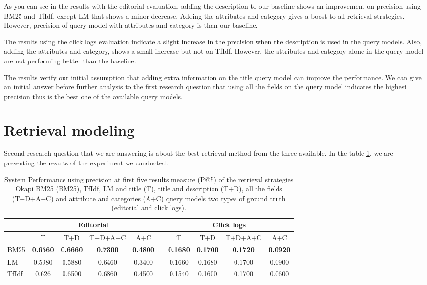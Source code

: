 As you can see in the results with the editorial evaluation, adding the description to our baseline shows an improvement on precision using BM25 and TfIdf, except LM that shows a minor decrease. Adding the attributes and category gives a boost to all retrieval strategies. However, precision of query model with attributes and category is than our baseline.

The results using the click logs evaluation indicate a slight increase in the precision when the description is used in the query models. Also, adding the attributes and category, shows a small increase but not on TfIdf. However, the attributes and category alone in the query model are not performing better than the baseline.

The results verify our initial assumption that adding extra information on the title query model can improve the performance. We can give an initial answer before further analysis to the first research question that using all the fields on the query model indicates the highest precision thus is the best one of the available query models.


\section{Retrieval modeling}

Second research question that we are answering is about the best retrieval method from the three available. In the table \ref{table:qmRes}, we are presenting the results of the experiment we conducted.

\begin{table}[H]
\begin{center}
\scriptsize
\caption{
System Performance using precision at first five results measure (P@5) of the retrieval strategies Okapi BM25 (BM25), TfIdf, LM and title (T), title and description (T+D), all the fields (T+D+A+C) and attribute and categories (A+C) query models two types of ground truth (editorial and click logs).}
\label{table:qmRes}

\begin{tabular}{lccccccccc}
\toprule
 & \multicolumn{4}{c}{Editorial} & &\multicolumn{4}{c}{Click logs} \\
\midrule
& T & T+D & T+D+A+C & A+C &   & T & T+D & T+D+A+C & A+C \\
\midrule
BM25 & \textbf{0.6560} & \textbf{0.6660} & \textbf{0.7300} & \textbf{0.4800} &   &\textbf{0.1680} & \textbf{0.1700} & \textbf{0.1720} & \textbf{0.0920} \\
LM & 0.5980 & 0.5880 & 0.6460 & 0.3400 &   & 0.1660 & 0.1680 & 0.1700 & 0.0900 \\
TfIdf & 0.626 & 0.6500 & 0.6860 & 0.4500 &   & 0.1540 & 0.1600 & 0.1700 & 0.0600 \\
\bottomrule
\end{tabular}
\end{center}
\end{table}



